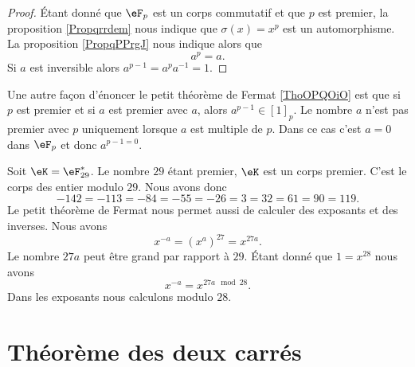 \begin{proof}
    Étant donné que \( \eF_p\) est un corps commutatif et que \( p\) est premier, la proposition \ref{Propqrrdem} nous indique que \( \sigma(x)=x^p\) est un automorphisme. La proposition \ref{PropqPPrgJ} nous indique alors que
    \begin{equation}
        a^p=a.
    \end{equation}
    Si \( a\) est inversible alors \( a^{p-1}=a^pa^{-1}=1\).
\end{proof}

\begin{remark}      \label{RemCoSnxh}
    Une autre façon d'énoncer le petit théorème de Fermat \ref{ThoOPQOiO} est que si \( p\) est premier et si \( a\) est premier avec \( a\), alors \( a^{p-1}\in[1]_p\). Le nombre \( a\) n'est pas premier avec \( p\) uniquement lorsque \( a\) est multiple de \( p\). Dans ce cas c'est \( a=0\) dans \( \eF_p\) et donc \( a^{p-1=0}\).
\end{remark}

\begin{example}
    Soit \( \eK=\eF_{29}^*\). Le nombre \( 29\) étant premier, \( \eK\) est un corps premier. C'est le corps des entier modulo \( 29\). Nous avons donc
    \begin{equation}
            -142=-113=-84=-55=-26=3=32=61=90=119.
    \end{equation}
    Le petit théorème de Fermat nous permet aussi de calculer des exposants et des inverses. Nous avons
    \begin{equation}
        x^{-a}=(x^a)^{27}=x^{27a}.
    \end{equation}
    Le nombre \( 27 a\) peut être grand par rapport à \( 29\). Étant donné que \( 1=x^{28}\) nous avons
    \begin{equation}
        x^{-a}=x^{27 a\mod 28}.
    \end{equation}
    Dans les exposants nous calculons modulo \( 28\).
\end{example}

\section{Théorème des deux carrés}

